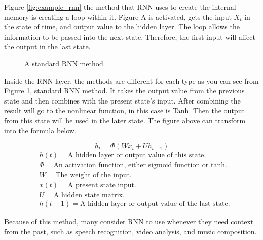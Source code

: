 \documentclass[12pt,oneside,openright,a4paper]{cpe-english-project}
\begin{document}
Figure \ref*{fig:example_rnn} the method that RNN uses to create the internal memory is
creating a loop within it. Figure A is activated, gets the input $X_t$ in the state of time,
and output value to the hidden layer. The loop allows the information to be passed into the
next state. Therefore, the first input will affect the output in the last state.

\begin{figure}[!h] \centering
  \setlength{\fboxrule}{0.2mm} %
  \setlength{\fboxsep}{0.5cm} %
  \caption{A standard RNN method} %
  \label{fig:standard_rnn} %
\end{figure}

Inside the RNN layer, the methods are different for each type as you can see from Figure
\ref*{fig:standard_rnn}, standard RNN method. It takes the output value from the previous
state and then combines with the present state’s input. After combining the result will go
to the nonlinear function, in this case is Tanh. Then the output from this state will be
used in the later state. The figure above can transform into the formula below.

\[h_t = \Phi(Wx_t + Uh_{t-1})\]
\begin{align*}
&h(t) = \text{A hidden layer or output value of this state.}\\
&\Phi = \text{An activation function, either sigmoid function or tanh.}\\
&W = \text{The weight of the input.}\\
&x(t) = \text{A present state input.}\\
&U = \text{A hidden state matrix.}\\
&h(t-1) = \text{A hidden layer or output value of the last state.}
\end{align*}

Because of this method, many consider RNN to use whenever they need context from the past,
such as speech recognition, video analysis, and music composition.
\end{document}
